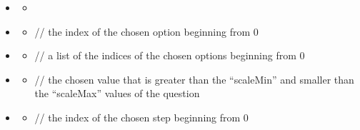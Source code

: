 \documentclass[a4paper]{scrreprt}
\begin{document}
{\begin{itemize}
                   \item {}
                       \begin{itemize}
                           \item {}
                       \end{itemize}

                    \item {}
                        \begin{itemize}
                            \item {}
                                \par // the index of the chosen option beginning from 0
                        \end{itemize}
                        
                   \item {}
                       \begin{itemize}
                           \item {}
                               \par // a list of the indices of the chosen options beginning from 0
                       \end{itemize}
                       
                    \item {}
                        \begin{itemize}
                            \item {}
                                \par // the chosen value that is greater than the “scaleMin” and smaller than the “scaleMax” values of the question
                        \end{itemize}
                        
                    \item {}
                        \begin{itemize}
                            \item {}
                                \par // the index of the chosen step beginning from 0
                        \end{itemize}


\end{itemize}}
\end{document}
